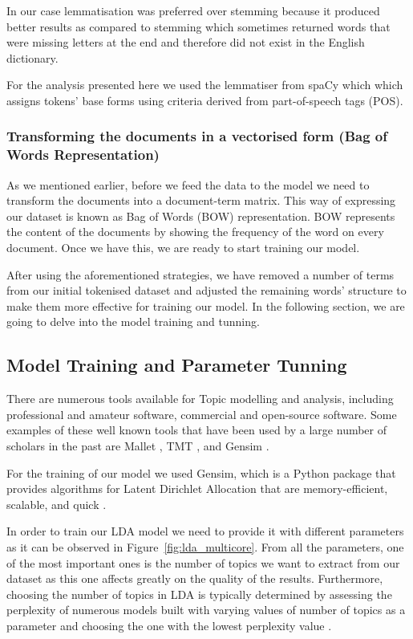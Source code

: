 \documentclass[twoside,12pt,a4paper]{article}
\begin{document}
In our case lemmatisation was preferred over stemming because it produced better results as compared to stemming which sometimes returned words that were missing letters at the end and therefore did not exist in the English dictionary.

For the analysis presented here we used the lemmatiser from spaCy \citep{spacy2} which which assigns tokens' base forms using criteria derived from part-of-speech tags (POS).

\subsubsection{Transforming the documents in a vectorised form (Bag of Words Representation)}
As we mentioned earlier, before we feed the data to the model we need to transform the documents into a document-term matrix. This way of expressing our dataset is known as Bag of Words (BOW) representation. BOW represents the content of the documents by showing the frequency of the word on every document. Once we have this, we are ready to start training our model.

After using the aforementioned strategies, we have removed a number of terms from our initial tokenised dataset and adjusted the remaining words' structure to make them more effective for training our model. In the following section, we are going to delve into the model training and tunning.

\subsection{Model Training and Parameter Tunning}
There are numerous tools available for Topic modelling and analysis, including professional and amateur software, commercial and open-source software. Some examples of these well known tools that have been used by a large number of scholars in the past are Mallet \citep{McCallumMALLET}, TMT \citep{2009-topic-modeling-social-sciences}, and Gensim \citep{jelodar_latent_2019}.

For the training of our model we used Gensim, which is a Python package that provides algorithms for Latent Dirichlet Allocation that are memory-efficient, scalable, and quick \citep{rehurek_gensimstatistical_nodate, Rehurek10softwareframework}.

In order to train our LDA model we need to provide it with different parameters as it can be observed in Figure~\ref{fig:lda_multicore}. From all the parameters, one of the most important ones is the number of topics we want to extract from our dataset as this one affects greatly on the quality of the results. Furthermore, choosing the number of topics in LDA is typically determined by assessing the perplexity of numerous models built with varying values of number of topics as a parameter and choosing the one with the lowest perplexity value \citep{blei_probabilistic_2010}.
\end{document}
